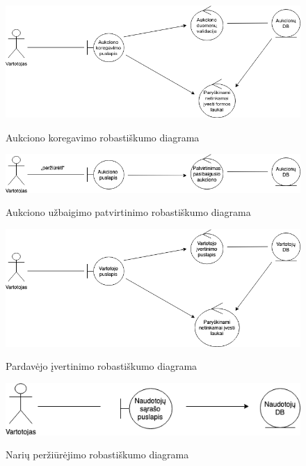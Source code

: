 \documentclass{VUMIFPSkursinis}
\begin{document}
		\begin{figure}[H]
		\centering
		\includegraphics[width=\linewidth]{img/koreguoti.png}
		\label{fig:koregavimas}
		\caption{Aukciono koregavimo robastiškumo diagrama}
	\end{figure}

		\begin{figure}[H]
		\centering
		\includegraphics[width=\linewidth]{img/patvirtinti.png}
		\label{fig:takebet}
		\caption{Aukciono užbaigimo patvirtinimo robastiškumo diagrama}
	\end{figure}

		\begin{figure}[H]
		\centering
		\includegraphics[width=\linewidth]{img/ivertinimas.png}
		\label{fig:ivertinimas}
		\caption{Pardavėjo įvertinimo robastiškumo diagrama}
	\end{figure}

		\begin{figure}[H]
		\centering
		\includegraphics[width=\linewidth]{img/nariai.png}
		\label{fig:narys}
		\caption{Narių peržiūrėjimo robastiškumo diagrama}
	\end{figure}
\end{document}

